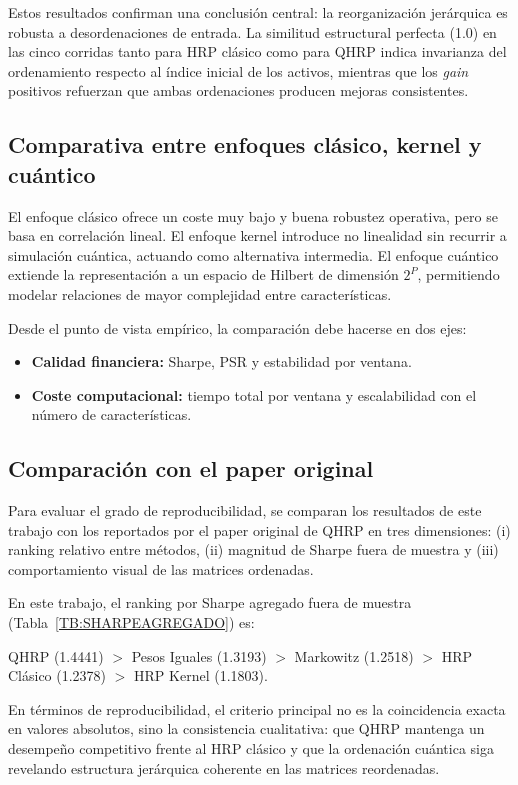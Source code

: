 Estos resultados confirman una conclusión central: la reorganización jerárquica es robusta a desordenaciones de entrada. La similitud estructural perfecta (1.0) en las cinco corridas tanto para HRP clásico como para QHRP indica invarianza del ordenamiento respecto al índice inicial de los activos, mientras que los \textit{gain} positivos refuerzan que ambas ordenaciones producen mejoras consistentes.

\subsection{Comparativa entre enfoques clásico, kernel y cuántico}
El enfoque clásico ofrece un coste muy bajo y buena robustez operativa, pero se basa en correlación lineal. El enfoque kernel introduce no linealidad sin recurrir a simulación cuántica, actuando como alternativa intermedia. El enfoque cuántico extiende la representación a un espacio de Hilbert de dimensión $2^P$, permitiendo modelar relaciones de mayor complejidad entre características.

Desde el punto de vista empírico, la comparación debe hacerse en dos ejes:

\begin{itemize}
	\item \textbf{Calidad financiera:} Sharpe, PSR y estabilidad por ventana.
	\item \textbf{Coste computacional:} tiempo total por ventana y escalabilidad con el número de características.
\end{itemize}

\subsection{Comparación con el paper original}
Para evaluar el grado de reproducibilidad, se comparan los resultados de este trabajo con los reportados por el paper original de QHRP en tres dimensiones: (i) ranking relativo entre métodos, (ii) magnitud de Sharpe fuera de muestra y (iii) comportamiento visual de las matrices ordenadas.

En este trabajo, el ranking por Sharpe agregado fuera de muestra (Tabla~\ref{TB:SHARPEAGREGADO}) es:

\begin{center}
QHRP (1.4441) $>$ Pesos Iguales (1.3193) $>$ Markowitz (1.2518) $>$ HRP Clásico (1.2378) $>$ HRP Kernel (1.1803).
\end{center}

En términos de reproducibilidad, el criterio principal no es la coincidencia exacta en valores absolutos, sino la consistencia cualitativa: que QHRP mantenga un desempeño competitivo frente al HRP clásico y que la ordenación cuántica siga revelando estructura jerárquica coherente en las matrices reordenadas.

